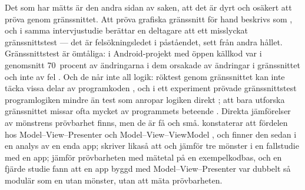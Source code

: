 Det som har mätts är den andra sidan av saken, att det är dyrt och
osäkert att pröva genom gränssnittet.  Att pröva grafiska gränssnitt för
hand beskrivs som ,
och i samma intervjustudie berättar en deltagare att ett misslyckat
gränssnittstest  --- det är felsökningsledet i påståendet, sett från andra
hållet.  Gränssnittstest är ömtåliga: i Android-projekt med öppen
källkod var i genomsnitt 70~procent av ändringarna i dem orsakade av
ändringar i gränssnittet och inte av fel \autocite{Coppola2019Fragility}.
Och de når inte all logik: röktest genom gränssnittet kan inte täcka
vissa delar av programkoden \autocite{MemonXie2005}, och i ett
experiment prövade gränssnittstest programlogiken mindre än test som
anropar logiken direkt \autocite{AlkhalidLabiche2017}; att bara utforska
gränssnittet missar ofta mycket av programmets beteende
\autocite{Gross2012EXSYST}.  Direkta
jämförelser av mönstrens prövbarhet finns, men de är få och små.
\Textcite{Lou2016Android} konstaterar att fördelen hos
Model--View--Presenter och Model--View--ViewModel
, och finner den sedan i en analys av
en enda app; \textcite{MagicsVerkman2023iOS} skriver likaså att
 och jämför tre mönster i en fallstudie med
en app; \textcite{Wilson2022MVVM} jämför prövbarheten med mätetal på en
exempelkodbas, och en fjärde studie fann att en app byggd med
Model--View--Presenter var dubbelt så modulär som en utan mönster, utan
att mäta prövbarheten\autocite{Prabowo2018MVP}.

